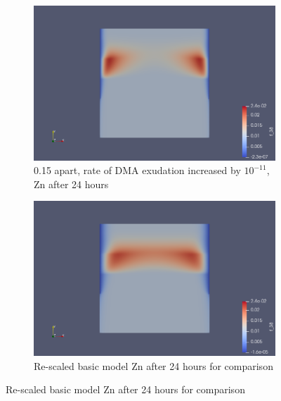 \documentclass[11pt]{article}
\numberwithin{equation}{section}
\begin{document}
 \begin{figure}
     \centering
     \begin{subfigure}[t]{0.45\textwidth}
     \includegraphics[width=\textwidth]{Figures/testpics/IncreasedBufferAndDistanceZn24.png}
     \caption{0.15 apart, rate of DMA exudation increased by $10^{-11}$, Zn after 24 hours}
     \end{subfigure}
     \begin{subfigure}[t]{0.45\textwidth}
     \includegraphics[width=\textwidth]{Figures/testpics/24rescaledZinc.png}
     \caption{Re-scaled basic model Zn after 24 hours for comparison}
     \end{subfigure}
 \end{figure}
 
\FloatBarrier
\end{document}
